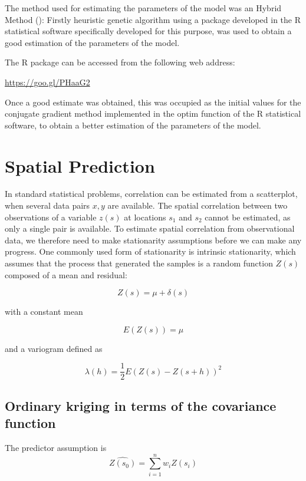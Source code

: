 \documentclass[11pt,twoside]{rmta2010esp}%
\begin{document}
The method used for estimating the parameters of the model was an Hybrid Method (\cite{McNelis2005}): Firstly heuristic genetic algorithm using a package developed in the R statistical software specifically developed for this purpose, was used to obtain 
a good estimation of the parameters of the model. 

The R package can be accessed from the following web address:
 
\url{https://goo.gl/PHaaG2}


Once a good estimate was obtained, this was occupied as the initial values for the conjugate gradient method implemented in the optim function of the R statistical software, to obtain a better estimation of the parameters of the model.  


\section{Spatial Prediction}
In standard statistical problems, correlation can be estimated from a scatterplot, when several data pairs ${x, y}$ are available. The spatial correlation between two observations of a variable $z(s)$ at locations $s_{1}$ and $s_{2}$ cannot be estimated, as only a single pair is available. To estimate spatial correlation
from observational data, we therefore need to make stationarity assumptions
before we can make any progress. One commonly used form of stationarity
is intrinsic stationarity, which assumes that the process that generated the
samples is a random function $Z(s)$ composed of a mean and residual:

\begin{equation}
Z(s) = \mu + \delta(s)
\end{equation}

with a constant mean 

\begin{equation}
E\left(Z(s)\right) = \mu
\end{equation}

and a variogram defined as 

\begin{equation}
\lambda(h) = \frac{1}{2}E\left(Z(s) - Z(s+h)\right)^{2}
\end{equation}


\subsection*{Ordinary kriging in terms of the covariance function}
The predictor assumption is 
\begin{equation}
\hat{Z(s_{0})} = \sum_{i=1}^{n} w_{i}Z(s_{i})
\end{equation}
\end{document}

